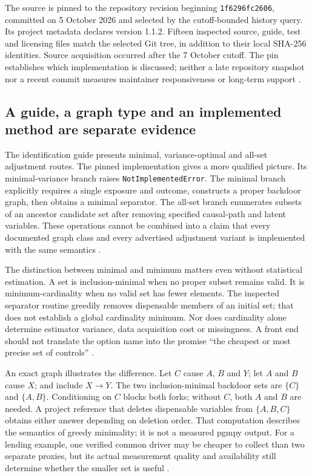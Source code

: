 The source is pinned to the repository revision beginning
\texttt{1f6296fc2606}, committed on 5 October 2026 and selected by the
cutoff-bounded history query. Its project metadata declares version 1.1.2.
Fifteen inspected source, guide, test and licensing files match the selected
Git tree, in addition to their local SHA-256 identities. Source acquisition
occurred after the 7 October cutoff. The pin establishes which implementation
is discussed; neither a late repository snapshot nor a recent commit measures
maintainer responsiveness or long-term support
\citep{exec13_pgmpy_reuse_primary}.

\subsection{A guide, a graph type and an implemented method are separate evidence}

The identification guide presents minimal, variance-optimal and all-set
adjustment routes. The pinned implementation gives a more qualified picture.
Its minimal-variance branch raises \texttt{NotImplementedError}. The minimal
branch explicitly requires a single exposure and outcome, constructs a
proper backdoor graph, then obtains a minimal separator. The all-set branch
enumerates subsets of an ancestor candidate set after removing specified
causal-path and latent variables. These operations cannot be combined into
a claim that every documented graph class and every advertised adjustment
variant is implemented with the same semantics
\citep{exec13_pgmpy_reuse_primary}.

The distinction between minimal and minimum matters even without statistical
estimation. A set is inclusion-minimal when no proper subset remains valid.
It is minimum-cardinality when no valid set has fewer elements. The inspected
separator routine greedily removes dispensable members of an initial set;
that does not establish a global cardinality minimum. Nor does cardinality
alone determine estimator variance, data acquisition cost or missingness.
A front end should not translate the option name into the promise
``the cheapest or most precise set of controls''
\citep{exec13_pgmpy_reuse_primary}.

An exact graph illustrates the difference. Let $C$ cause $A$, $B$ and $Y$;
let $A$ and $B$ cause $X$; and include $X\to Y$. The two inclusion-minimal
backdoor sets are $\{C\}$ and $\{A,B\}$. Conditioning on $C$ blocks both
forks; without $C$, both $A$ and $B$ are needed. A project reference that
deletes dispensable variables from $\{A,B,C\}$ obtains either answer
depending on deletion order. That computation describes the semantics of
greedy minimality; it is not a measured pgmpy output. For a lending example,
one verified common driver may be cheaper to collect than two separate
proxies, but its actual measurement quality and availability still determine
whether the smaller set is useful \citep{exec13_pgmpy_reuse_oracle}.

